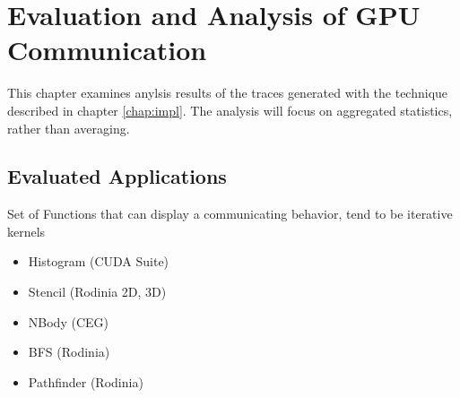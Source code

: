\chapter{Evaluation and Analysis of GPU Communication}\label{eval}
This chapter examines anylsis results of the traces generated with the technique described in chapter \ref{chap:impl}.
The analysis will focus on aggregated statistics, rather than averaging. 

\section{Evaluated Applications}
	Set of Functions that can display a communicating behavior, tend to be iterative kernels
\begin{itemize}
	\item Histogram (CUDA Suite)
	\item Stencil (Rodinia 2D, 3D)
	\item NBody (CEG)
	\item BFS (Rodinia)
	\item Pathfinder (Rodinia)
\end{itemize}

